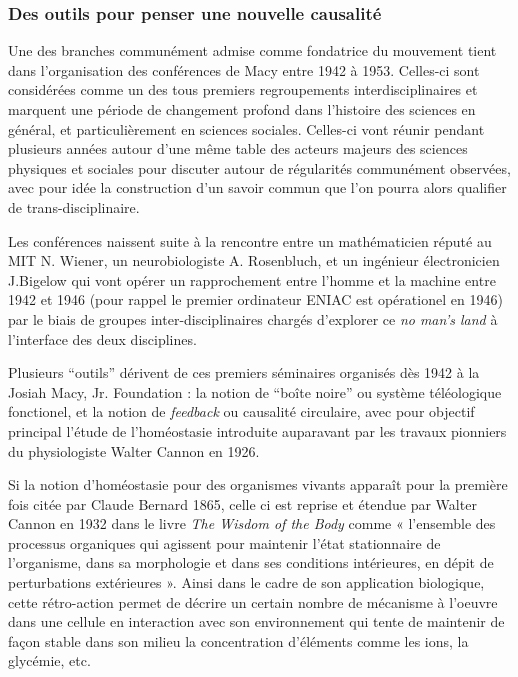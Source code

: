 \subsubsection{Des outils pour penser une nouvelle causalité}

Une des branches communément admise comme fondatrice du mouvement tient dans l'organisation des conférences de Macy entre 1942 à 1953. Celles-ci sont considérées comme un des tous premiers regroupements interdisciplinaires et marquent une période de changement profond dans l'histoire des sciences en général, et particulièrement en sciences sociales. Celles-ci vont réunir pendant plusieurs années autour d'une même table des acteurs majeurs des sciences physiques et sociales pour discuter autour de régularités communément observées, avec pour idée la construction d'un savoir commun que l'on pourra alors qualifier de trans-disciplinaire.

Les conférences naissent suite à la rencontre entre un mathématicien réputé au MIT N. Wiener, un neurobiologiste A. Rosenbluch, et un ingénieur électronicien J.Bigelow qui vont opérer un rapprochement entre l'homme et la machine entre 1942 et 1946 (pour rappel le premier ordinateur ENIAC est opérationel en 1946) par le biais de groupes inter-disciplinaires chargés d'explorer ce \textit{no man's land} à l'interface des deux disciplines.

Plusieurs \enquote{outils} dérivent de ces premiers séminaires organisés dès 1942 à la Josiah Macy, Jr. Foundation : la notion de \enquote{boîte noire} ou système téléologique fonctionel, et la notion de \textit{feedback} ou causalité circulaire, avec pour objectif principal l'étude de l'homéostasie introduite auparavant par les travaux pionniers du physiologiste Walter Cannon en 1926.

Si la notion d'homéostasie pour des organismes vivants apparaît pour la première fois citée par Claude Bernard 1865, celle ci est reprise et étendue par Walter Cannon en 1932 dans le livre \textit{The Wisdom of the Body} \autocite{Cannon1932} comme « l’ensemble des processus organiques qui agissent pour maintenir l’état stationnaire de l’organisme, dans sa morphologie et dans ses conditions intérieures, en dépit de perturbations extérieures ». Ainsi dans le cadre de son application biologique, cette rétro-action permet de décrire un certain nombre de mécanisme à l'oeuvre dans une cellule en interaction avec son environnement qui tente de maintenir de façon stable dans son milieu la concentration d'éléments comme les ions, la glycémie, etc.

